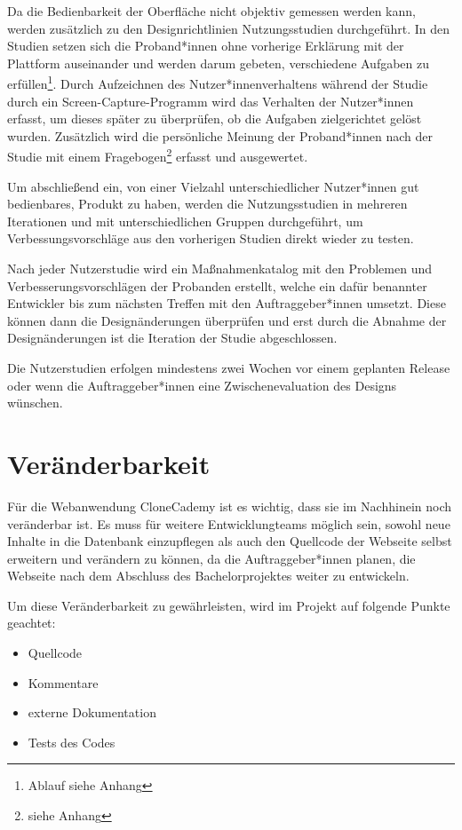\documentclass[accentcolor=tud0b,12pt,paper=a4]{tudreport}
\begin{document}
Da die Bedienbarkeit der Oberfläche nicht objektiv gemessen werden kann, werden zusätzlich zu den Designrichtlinien Nutzungsstudien durchgeführt. In den Studien setzen sich die Proband*innen ohne vorherige Erklärung mit der Plattform auseinander und werden darum gebeten, verschiedene Aufgaben zu erfüllen\footnote{Ablauf siehe Anhang}. Durch Aufzeichnen des Nutzer*innenverhaltens während der Studie durch ein Screen-Capture-Programm wird das Verhalten der Nutzer*innen erfasst, um dieses später zu überprüfen, ob die Aufgaben zielgerichtet gelöst wurden. Zusätzlich wird die persönliche Meinung der Proband*innen nach der Studie mit einem Fragebogen\footnote{siehe Anhang} erfasst und ausgewertet.

Um abschließend ein, von einer Vielzahl unterschiedlicher Nutzer*innen gut bedienbares, Produkt zu haben, werden die Nutzungsstudien in mehreren Iterationen und mit unterschiedlichen Gruppen durchgeführt, um Verbessungsvorschläge aus den vorherigen Studien direkt wieder zu testen. 

Nach jeder Nutzerstudie wird ein Maßnahmenkatalog mit den Problemen und Verbesserungsvorschlägen der Probanden erstellt, welche ein dafür benannter Entwickler bis zum nächsten Treffen mit den Auftraggeber*innen umsetzt. Diese können dann die Designänderungen überprüfen und erst durch die Abnahme der Designänderungen ist die Iteration der Studie abgeschlossen.

Die Nutzerstudien erfolgen mindestens zwei Wochen vor einem geplanten Release oder wenn die Auftraggeber*innen eine Zwischenevaluation des Designs wünschen.
\pagebreak

\section{Veränderbarkeit}
Für die Webanwendung CloneCademy ist es wichtig, dass sie im Nachhinein noch veränderbar ist. Es muss für weitere Entwicklungteams möglich sein, sowohl neue Inhalte in die Datenbank einzupflegen als auch den Quellcode der Webseite selbst erweitern und verändern zu können, da die Auftraggeber*innen planen, die Webseite nach dem Abschluss des Bachelorprojektes weiter zu entwickeln.

Um diese Veränderbarkeit zu gewährleisten, wird im Projekt auf folgende Punkte geachtet:
\begin{itemize}
	\item Quellcode
	\item Kommentare
	\item externe Dokumentation
	\item Tests des Codes
\end{itemize}
\end{document}

